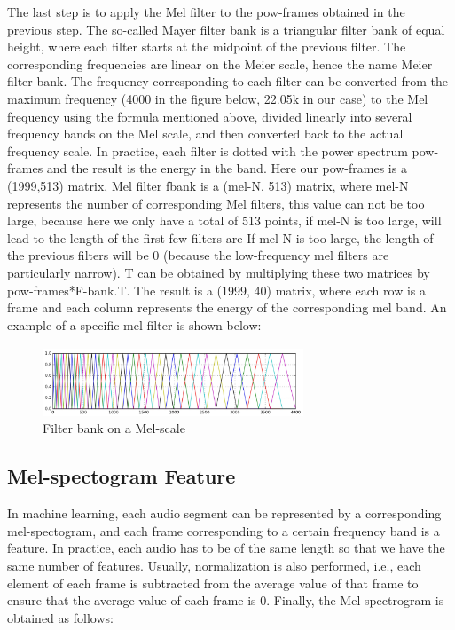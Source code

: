 The last step is to apply the Mel filter to the pow-frames obtained in the previous step. The so-called Mayer filter bank is a triangular filter bank of equal height, where each filter starts at the midpoint of the previous filter. The corresponding frequencies are linear on the Meier scale, hence the name Meier filter bank. The frequency corresponding to each filter can be converted from the maximum frequency (4000 in the figure below, 22.05k in our case) to the Mel frequency using the formula mentioned above, divided linearly into several frequency bands on the Mel scale, and then converted back to the actual frequency scale. In practice, each filter is dotted with the power spectrum pow-frames and the result is the energy in the band. Here our pow-frames is a (1999,513) matrix, Mel filter fbank is a (mel-N, 513) matrix, where mel-N represents the number of corresponding Mel filters, this value can not be too large, because here we only have a total of 513 points, if mel-N is too large, will lead to the length of the first few filters are If mel-N is too large, the length of the previous filters will be 0 (because the low-frequency mel filters are particularly narrow). T can be obtained by multiplying these two matrices by pow-frames*F-bank.T. The result is a (1999, 40) matrix, where each row is a frame and each column represents the energy of the corresponding mel band. An example of a specific mel filter is shown below:
\begin{figure}[!htbp]
	\centering
	\includegraphics[width = 0.7\textwidth]{figures_ning/audio_5.png}
	\caption[Filter bank on a Mel-scale]
	{ Filter bank on a Mel-scale}
	\label{fig:audio_5}
\end{figure}

\subsection{Mel-spectogram Feature}

In machine learning, each audio segment can be represented by a corresponding mel-spectogram, and each frame corresponding to a certain frequency band is a feature. In practice, each audio has to be of the same length so that we have the same number of features. Usually, normalization is also performed, i.e., each element of each frame is subtracted from the average value of that frame to ensure that the average value of each frame is 0. Finally, the Mel-spectrogram is obtained as follows:

